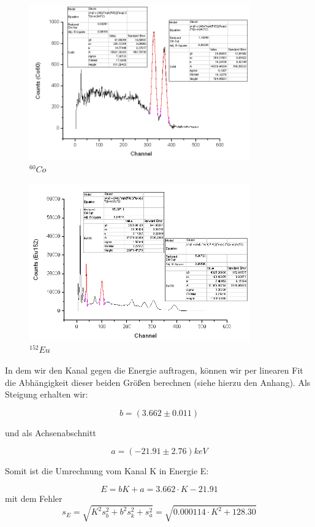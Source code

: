 \begin{figure}[H]
\centering \includegraphics[width = 0.85\textwidth]{auswertung/Co60.png}
\caption{$^{60}Co$}
\end{figure}

\begin{figure}[H]
\centering \includegraphics[width = 0.85\textwidth]{auswertung/Eu152.png}
\caption{$^{152}Eu$}
\end{figure}


In dem wir den Kanal gegen die Energie auftragen, können wir per linearen Fit die Abhängigkeit dieser beiden Größen berechnen (siehe hierzu den Anhang). Als Steigung erhalten wir:

$$ b = (3.662 \pm 0.011) $$

und als Achsenabschnitt

$$ a = (-21.91 \pm 2.76) keV $$

Somit ist die Umrechnung vom Kanal K in Energie E:

$$ \boxed{E = bK + a = 3.662\cdot K - 21.91} $$ 
mit dem Fehler
$$ s_E = \sqrt{K^2s_b^2 + b^2s_k^2 + s_a^2} = \sqrt{0.000114\cdot K^2 + 128.30} $$

